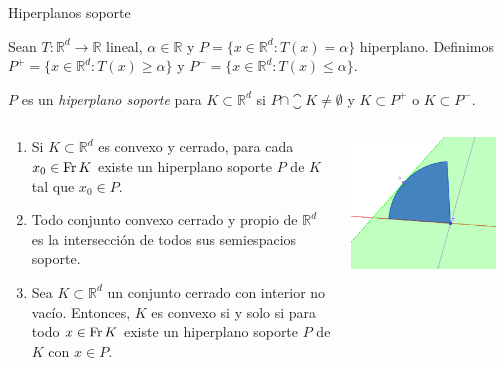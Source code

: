 \documentclass[10pt, compress]{beamer}
\newcommand\R{\mathbb{R}}
\begin{document}
\begin{frame}{Hiperplanos soporte}
  \begin{definition}
    Sean $T \colon \R^d \to \R$ lineal, $\alpha \in \R$ y $P = \{x \in \R^d \colon T(x) = \alpha \}$ hiperplano. Definimos $P^+ = \{x \in \R^d \colon T(x) \ge \alpha \}$ y $P^- = \{x \in \R^d \colon T(x) \le \alpha \}$.

    $P$ es un \emph{hiperplano soporte} para $K \subset \R^d$ si $P \cap \closure{K} \ne \emptyset$ y $K \subset P^+$ o $K \subset P^-$.
  \end{definition}

  \begin{columns}
    \begin{theorem}
      \begin{enumerate}
        \item Si $K \subset \R^d$ es convexo y cerrado, para cada $x_0 \in \operatorname{Fr} K$ existe un hiperplano soporte $P$ de $K$ tal que $x_0 \in P$.
        \item Todo conjunto convexo cerrado y propio de $\R^d$ es la intersección de todos sus semiespacios soporte.
        \item Sea $K \subset \R^d$ un conjunto cerrado con interior no vacío. Entonces, $K$ es convexo si y solo si para todo $x \in \operatorname{Fr} K$ existe un hiperplano soporte $P$ de $K$ con $x \in P$.
      \end{enumerate}
    \end{theorem}

    \includegraphics[width=0.9\textwidth]{images/supporting_hyperplane.png}
  \end{columns}
\end{frame}
\end{document}
